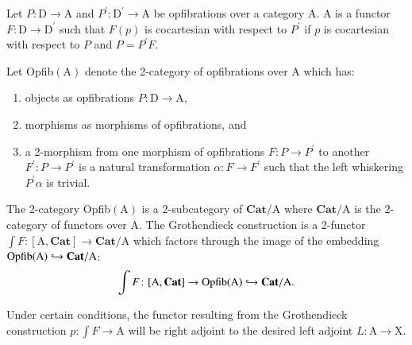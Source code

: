 \documentclass{amsart}
\begin{document}
\begin{defn}
Let $P \colon \mathrm{D} \to \mathrm{A}$ and $P^\prime \colon \mathrm{D^\prime} \to \mathrm{A}$ be opfibrations over a category $\mathrm{A}$. A  is a functor $F \colon \mathrm{D} \to \mathrm{D}^\prime$ such that $F(p)$ is cocartesian with respect to $P^\prime$ if $p$ is cocartesian with respect to $P$ and $P=P^\prime F$.
\end{defn}

Let Opfib$(\mathrm{A})$ denote the 2-category of opfibrations over $\mathrm{A}$ which has:
\begin{enumerate}
\item{objects as opfibrations $P \colon \mathrm{D} \to \mathrm{A}$,}
\item{morphisms as morphisms of opfibrations, and}
\item{a 2-morphism from one morphism of opfibrations $F \colon P \to P^\prime$ to another $F^\prime \colon P \to P^\prime$ is a natural transformation $\alpha \colon F \to F^\prime$ such that the left whiskering $P^\prime \alpha$ is trivial.}
\end{enumerate}

The 2-category Opfib$(\mathrm{A})$ is a 2-subcategory of $\mathbf{Cat}/ \mathrm{A}$ where $\mathbf{Cat} / \mathrm{A}$ is the 2-category of functors over $\mathrm{A}$. The Grothendieck construction is a 2-functor $\int F \colon [ \mathrm{A},\mathbf{Cat}] \to \mathbf{Cat}/ \mathrm{A}$ which factors through the image of the embedding $\textnormal{Opfib}(\mathrm{A}) \hookrightarrow \mathbf{Cat} / \mathrm{A}$: $$\int F \colon [ \mathrm{A}, \mathbf{Cat} ] \to \textnormal{Opfib}(\mathrm{A}) \hookrightarrow \mathbf{Cat} / \mathrm{A}.$$

Under certain conditions, the functor resulting from the Grothendieck construction $p \colon \int{F} \to \mathrm{A}$ will be right adjoint to the desired left adjoint $L \colon \mathrm{A} \to \mathrm{X}$.
\end{document}
